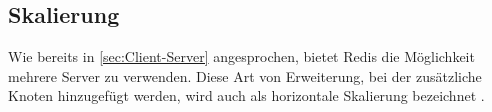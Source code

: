 
\subsection{Skalierung}
\label{sec:Skalierung}
Wie bereits in \autoref{sec:Client-Server} angesprochen, bietet Redis die Möglichkeit mehrere Server zu verwenden.
Diese Art von Erweiterung, bei der zusätzliche Knoten hinzugefügt werden, wird auch als horizontale Skalierung bezeichnet \cite{Fasel2016}.
